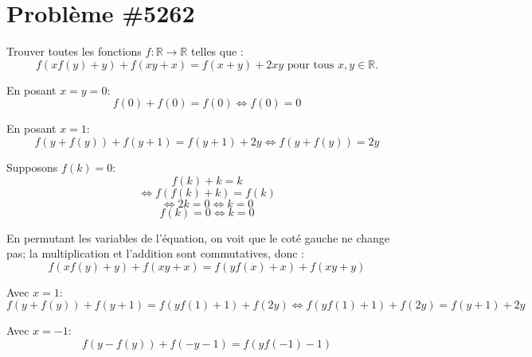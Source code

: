 \documentclass[12pt]{article}
\begin{document}
\section*{Problème \#5262}

Trouver toutes les fonctions $f : \mathbb{R} \to \mathbb{R}$ telles que :
$$f(xf(y)+y) + f(xy+x) = f(x+y) + 2xy  \text{ pour tous } x, y \in \mathbb{R}.$$

En posant $x=y=0:$
$$f(0) + f(0) = f(0) \iff \boxed{f(0) = 0}$$

En posant $x=1:$
$$f(y + f(y)) + f(y+1) = f(y+1) + 2y \iff \boxed{f(y+f(y)) = 2y}$$

Supposons $f(k) = 0:$
$$f(k) + k = k$$
$$\iff f(f(k) + k) = f(k)$$
$$\iff 2k = 0 \iff k=0$$
$$\boxed{f(k) = 0 \iff k = 0}$$

En permutant les variables de l'équation, on voit que le coté gauche ne change pas;
 la multiplication et l'addition sont commutatives, donc : 
$$ \boxed{f(xf(y) + y) + f(xy + x) = f(yf(x) + x) + f(xy + y)}$$

Avec $x=1:$
$$f(y + f(y)) + f(y + 1) = f(yf(1) + 1) + f(2y) \iff \boxed{f(yf(1) + 1) + f(2y) = f(y + 1) + 2y}$$

Avec $x=-1:$
$$ \boxed{f(y - f(y)) + f(-y - 1) = f(yf(-1) -1)}$$
\end{document}

